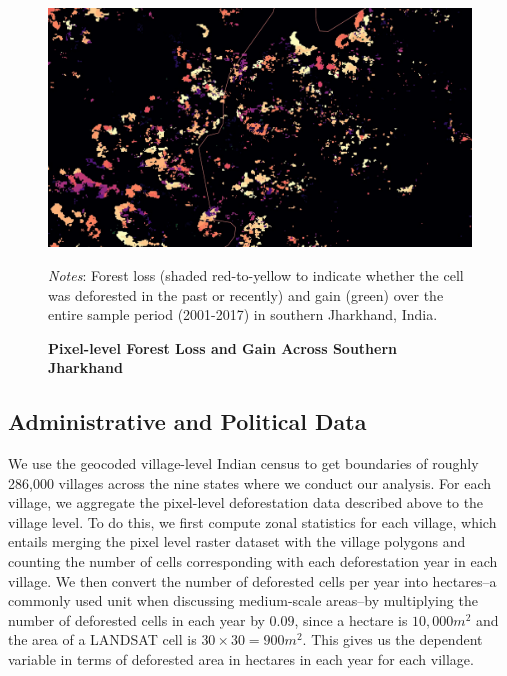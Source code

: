 \documentclass[12pt,reqno]{article}
\begin{document}
\begin{figure}[htbp!]
\begin{center}
\begin{minipage}{1 \linewidth}
\caption{\textbf{Pixel-level Forest Loss and Gain Across Southern Jharkhand}\label{fig:lossgain}}	\centerline{\includegraphics[width=5 in,angle=0]{Figs/loss_v_gain.pdf}}
\smallskip
\normalsize
\emph{Notes}: Forest loss (shaded red-to-yellow to indicate whether the cell was deforested in the past or recently) and gain (green) over the entire sample period (2001-2017) in southern Jharkhand, India. %
\end{minipage}
\end{center}
\end{figure}



\subsection{Administrative and Political Data} %
\label{sub:administrative_and_political_data}


We use the \textcite{infomap2001indiamap} geocoded village-level Indian census to get boundaries of roughly 286,000 villages across the nine states where we conduct our analysis. For each village, we aggregate the pixel-level deforestation data described above to the village level. To do this, we first compute zonal statistics for each village, which entails merging the pixel level raster dataset with the village polygons and counting the number of cells corresponding with each deforestation year in each village.  We then convert the number of deforested cells per year into hectares--a commonly used unit when discussing medium-scale areas--by multiplying the number of deforested cells in each year by $0.09$, since a hectare is $10,000 m^2$ and the area of a LANDSAT cell is $30\times30=900 m^2$. This gives us the dependent variable in terms of deforested area in hectares in each year for each village.
\end{document}
